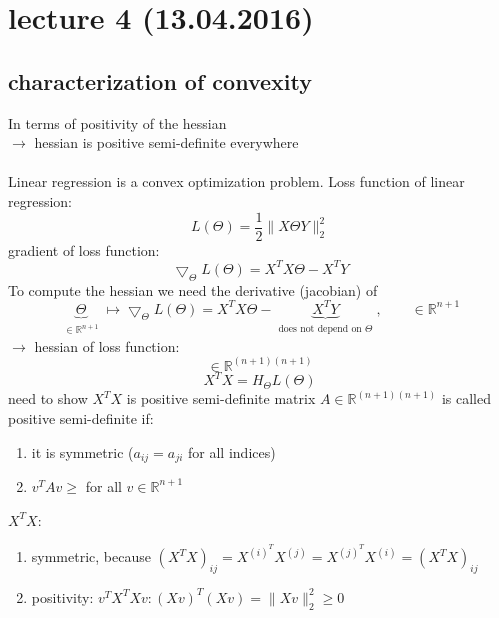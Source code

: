 \section*{lecture 4 (13.04.2016)}
\subsection*{characterization of convexity}
In terms of positivity of the hessian\\
$\rightarrow$ hessian is positive semi-definite everywhere\\\\
Linear regression is a convex optimization problem. Loss function of linear regression:
\[ L(\Theta) = \frac{1}{2} \lVert X \Theta Y \lVert^2_2\]
gradient of loss function:
\[\bigtriangledown_\Theta L(\Theta) = X^T X \Theta- X^T Y\]
To compute the hessian we need the derivative (jacobian) of
\[\underbrace{\Theta}_{\substack{\in \mathbb{R}^{n+1}}} \mapsto \bigtriangledown_\Theta L(\Theta) = X^T X \Theta- \underbrace{X^T Y}_{\substack{\text{does not depend on $\Theta$}}}, \quad\quad \in \mathbb{R}^{n+1}\]
$\rightarrow$ hessian of loss function:
\[\in \mathbb{R}^{(n+1)(n+1)}\]
\[X^T X = H_\Theta L(\Theta)\]
need to show $X^T X$ is positive semi-definite matrix $A \in \mathbb{R}^{(n+1)(n+1)}$ is called positive semi-definite if:
\begin{enumerate}[1.]
\item it is symmetric ($a_{ij} = a_{ji}$ for all indices)
\item $v^T Av \geq$ for all $v \in \mathbb{R}^{n+1}$
\end{enumerate}

$X^T X$:
\begin{enumerate}[1.]
\item symmetric, because $(X^T X)_{ij} = X^{(i)^T}X^{(j)}=X^{(j)^T}X^{(i)} = (X^T X)_{ij}$
\item positivity: $v^T X^T Xv: (Xv)^T(Xv) = \lVert Xv \lVert^2_2 \geq 0$
\end{enumerate}

